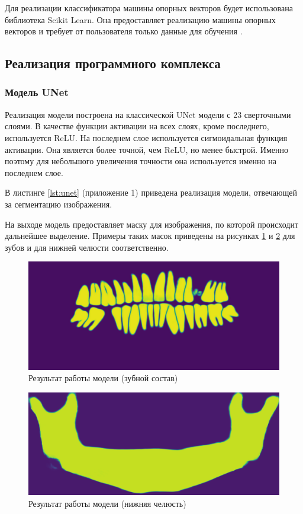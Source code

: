 Для реализации классификатора машины опорных векторов будет использована библиотека Scikit Learn. Она предоставляет реализацию машины опорных векторов и требует от пользователя только данные для обучения \cite{scikitsvm}.

\subsection{Реализация программного комплекса}

\subsubsection{Модель UNet}

Реализация модели построена на классической UNet модели с 23 сверточными слоями. В качестве функции активации на всех слоях, кроме последнего, используется ReLU. На последнем слое используется сигмоидальная функция активации. Она является более точной, чем ReLU, но менее быстрой. Именно поэтому для небольшого увеличения точности она используется именно на последнем слое.

В листинге \ref{lst:unet} (приложение 1) приведена реализация модели, отвечающей за сегментацию изображения.

На выходе модель предоставляет маску для изображения, по которой происходит дальнейшее выделение. Примеры таких масок приведены на рисунках \ref{fig:mask} и \ref{fig:maskmand} для зубов и для нижней челюсти соответственно.

\begin{figure}[H]
	\centering
	\includegraphics[width=\textwidth]{img/mask.png}
	\caption{Результат работы модели (зубной состав)}
	\label{fig:mask}
\end{figure}


\begin{figure}[H]
	\centering
	\includegraphics[width=\textwidth]{img/maskmand.png}
	\caption{Результат работы модели (нижняя челюсть)}
	\label{fig:maskmand}
\end{figure}

